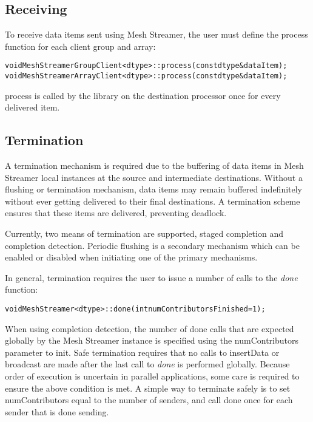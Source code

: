 \subsection{Receiving}

To receive data items sent using Mesh Streamer, the user must define
the process function for each client group and array:

\begin{alltt}
void MeshStreamerGroupClient<dtype>::process(const dtype &dataItem);
void MeshStreamerArrayClient<dtype>::process(const dtype &dataItem);
\end{alltt}

process is called by the library on the destination processor once for
every delivered item.

\subsection{Termination}

A termination mechanism is required due to the buffering of data items
in Mesh Streamer local instances at the source and intermediate
destinations. Without a flushing or termination mechanism, data items
may remain buffered indefinitely without ever getting delivered to
their final destinations. A termination scheme ensures that these
items are delivered, preventing deadlock. 

Currently, two means of termination are supported, staged completion
and completion detection. Periodic flushing is a secondary mechanism
which can be enabled or disabled when initiating one of the primary
mechanisms. 

In general, termination requires the user to issue a number of calls
to the \emph{done} function:
\begin{alltt}
 void MeshStreamer<dtype>::done(int numContributorsFinished = 1);
\end{alltt}
When using completion detection, the number of done calls that are
expected globally by the Mesh Streamer instance is specified using the
numContributors parameter to init. Safe termination requires that no
calls to insertData or broadcast are made after the last call to
\emph{done} is performed globally. Because order of execution is
uncertain in parallel applications, some care is required to ensure
the above condition is met. A simple way to terminate safely is to set
numContributors equal to the number of senders, and call done once for
each sender that is done sending.

